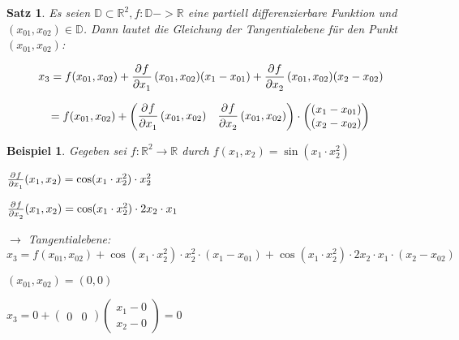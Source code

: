 \documentclass[fontset=ubuntu,12pt,a4paper]{scrreprt}
\newtheorem{beispiel}[defi]{Beispiel}
\newtheorem{satz}[defi]{Satz}
\begin{document}
\begin{satz}
Es seien \(\mathbb{D} \subset \mathbb{R}^2, f:\mathbb{D}->\mathbb{R}\) eine partiell differenzierbare Funktion und \((x_{01},x_{02})\in\mathbb{D}\). Dann lautet die Gleichung der Tangentialebene für den Punkt \((x_{01},x_{02})\):

\[x_3=f(x_{01},x_{02})+\dpd{f}{x_1}(x_{01},x_{02})(x_1-x_{01})+\dpd{f}{x_2}(x_{01},x_{02})(x_2-x_{02})\]

\[=f(x_{01},x_{02})+\begin{pmatrix} \dpd{f}{x_1} (x_{01},x_{02}) & \dpd{f}{x_2}(x_{01},x_{02}) \end{pmatrix} \cdot \begin{pmatrix} (x_1-x_{01})\\ (x_2-x_{02}) \end{pmatrix}\]
\end{satz}

\begin{beispiel}
    Gegeben sei \(f:\mathbb{R}^2\to\mathbb{R}\) durch \(f(x_1,x_2)=\sin(x_1\cdot x_2^2)\)

    \(\pd{f}{x_1}(x_1,x_2)=\cos(x_1\cdot x_2^2)\cdot x_2^2\)
    
    \(\pd{f}{x_2}(x_1,x_2)=\cos(x_1\cdot x_2^2)\cdot 2x_2 \cdot x_1\)
    
    \(\to\) Tangentialebene: \(x_3 = f(x_{01},x_{02}) + \cos(x_1\cdot x_2^2)\cdot x_2^2 \cdot (x_1 - x_{01}) + \cos(x_1\cdot x_2^2)\cdot 2x_2 \cdot x_1 \cdot (x_2 - x_{02})\)
    
    \((x_{01},x_{02}) = (0,0)\)
    
    \(x_3 = 0 + \begin{pmatrix}0 & 0\end{pmatrix} \begin{pmatrix}x_1 - 0 \\ x_2 - 0\end{pmatrix} = 0\)
    
\end{beispiel}
\end{document}
